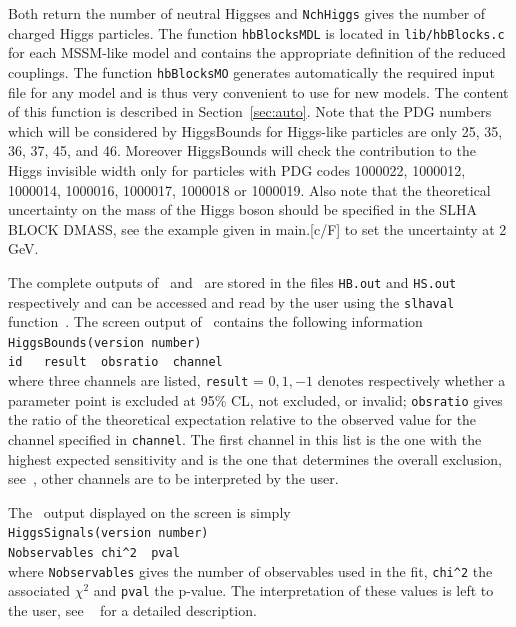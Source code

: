 \documentclass[12pt,a4paper]{article}
\begin{document}
Both return the  number of neutral Higgses and {\tt NchHiggs} gives the number of charged Higgs particles.
The function \verb|hbBlocksMDL|  is located in  \verb|lib/hbBlocks.c| for each MSSM-like model and contains the appropriate definition of the reduced couplings. The function \verb|hbBlocksMO|  generates automatically the required input file for any model and is thus very convenient to use  for new  models. The content of this function is described in Section~\ref{sec:auto}.  Note that the PDG numbers which will be considered by HiggsBounds for Higgs-like particles are only 25, 35, 36, 37, 45, and 46. Moreover HiggsBounds will check the contribution to the Higgs invisible width only for particles with PDG codes  1000022, 1000012, 1000014, 1000016, 1000017, 1000018 or 1000019.
Also note that the theoretical uncertainty  on the  mass of the Higgs boson should be specified in the SLHA BLOCK DMASS, see the example given in  main.[c/F] to set the uncertainty at 2 GeV.

%
The complete outputs of \HB\ and \HS\ are stored in the files  \verb|HB.out| and \verb|HS.out| respectively and can be accessed  and read  by the user using the \verb|slhaval| function~\cite{Belanger:2014hqa}.
The screen output of \micro\ contains the following information\\
 
\noindent
\verb|HiggsBounds(version number)|\\
\verb|id   result  obsratio  channel |\\
 
\noindent
where three channels are listed,  \verb|result| = $0,1,-1$ denotes respectively whether a parameter point is excluded at 95\% CL, not excluded, or invalid; \verb|obsratio| gives the ratio of the theoretical expectation relative to the observed value  for the channel specified in \verb|channel|. The first channel in this list is the one with the highest expected sensitivity and is the one that determines the overall exclusion, see~\cite{Bechtle:2013wla}, other channels are to be interpreted by the user. 


The \HS\ output displayed on the screen is simply \\

\noindent
\verb|HiggsSignals(version number)|\\
\verb|Nobservables chi^2  pval|\\

\noindent
where \verb|Nobservables| gives the number of observables used in the fit, \verb|chi^2| the associated $\chi^2$ and \verb|pval| the p-value. 
The interpretation of these values is left to the user, see ~\cite{Bechtle:2013xfa} for a detailed description.
\end{document}
